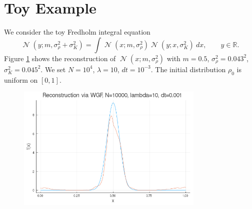 \documentclass[a4paper]{article}
\DeclareMathOperator{\N}{\mathcal{N}}
\begin{document}
\section{Toy Example}

We consider the toy Fredholm integral equation
\begin{equation*}
\N(y; m, \sigma_{\rho}^2 + \sigma_K^2) = \int \N(x; m, \sigma_{\rho}^2)\N(y; x, \sigma_K^2)\ dx,\qquad y\in\mathbb{R}.
\end{equation*}
Figure \ref{fig:at} shows the reconstruction of $\N(x; m, \sigma_{\rho}^2)$ with $m=0.5$, $\sigma_{\rho}^2 = 0.043^2$, $\sigma_K^2 = 0.045^2$.
We set $N=10^{4}$, $\lambda = 10$, $dt = 10^{-3}$. The initial distribution $\rho_0$ is uniform on $[0, 1]$.

\begin{figure}
\centering
\includegraphics[width = 0.8\textwidth]{analitically_tractable}
\caption{ }
\label{fig:at}
\end{figure}



\end{document}
